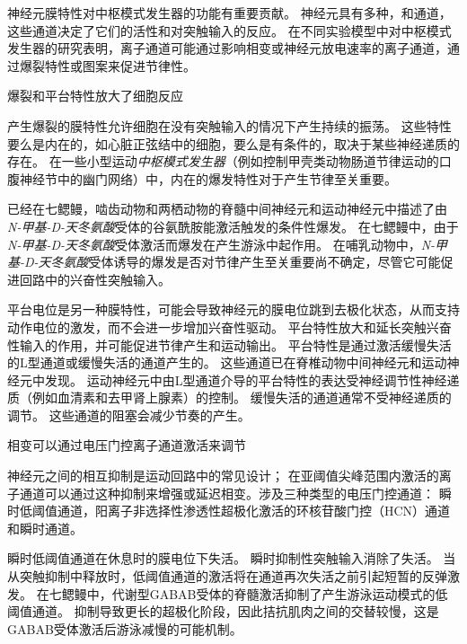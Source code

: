 \begin{proposition}[神经元离子通道有助于中枢模式发生器功能] \label{box:33_2}
	
	\quad \quad 神经元膜特性对中枢模式发生器的功能有重要贡献。
	神经元具有多种，和通道，这些通道决定了它们的活性和对突触输入的反应。
	在不同实验模型中对中枢模式发生器的研究表明，离子通道可能通过影响相变或神经元放电速率的离子通道，通过爆裂特性或图案来促进节律性。
	
	\quad \quad 爆裂和平台特性放大了细胞反应
	
	\quad \quad 产生爆裂的膜特性允许细胞在没有突触输入的情况下产生持续的振荡。
	这些特性要么是内在的，如心脏正弦结中的细胞，要么是有条件的，取决于某些神经递质的存在。
	在一些小型运动\textit{中枢模式发生器}（例如控制甲壳类动物肠道节律运动的口腹神经节中的幽门网络）中，内在的爆发特性对于产生节律至关重要。
	
	\quad \quad 已经在七鳃鳗，啮齿动物和两栖动物的脊髓中间神经元和运动神经元中描述了由\textit{N-甲基-D-天冬氨酸}受体的谷氨酰胺能激活触发的条件性爆发。
	在七鳃鳗中，由于\textit{N-甲基-D-天冬氨酸}受体激活而爆发在产生游泳中起作用。
	在哺乳动物中，\textit{N-甲基-D-天冬氨酸}受体诱导的爆发是否对节律产生至关重要尚不确定，尽管它可能促进回路中的兴奋性突触输入。
	
	\quad \quad 平台电位是另一种膜特性，可能会导致神经元的膜电位跳到去极化状态，从而支持动作电位的激发，而不会进一步增加兴奋性驱动。
	平台特性放大和延长突触兴奋性输入的作用，并可能促进节律产生和运动输出。
	平台特性是通过激活缓慢失活的L型通道或缓慢失活的通道产生的。
	这些通道已在脊椎动物中间神经元和运动神经元中发现。
	运动神经元中由L型通道介导的平台特性的表达受神经调节性神经递质（例如血清素和去甲肾上腺素）的控制。
	缓慢失活的通道通常不受神经递质的调节。
	这些通道的阻塞会减少节奏的产生。
	
	\quad \quad 相变可以通过电压门控离子通道激活来调节
	
	\quad \quad 神经元之间的相互抑制是运动回路中的常见设计；
	在亚阈值尖峰范围内激活的离子通道可以通过这种抑制来增强或延迟相变。涉及三种类型的电压门控通道：
	瞬时低阈值通道，阳离子非选择性渗透性超极化激活的环核苷酸门控（HCN）通道和瞬时通道。
	
	\quad \quad 瞬时低阈值通道在休息时的膜电位下失活。
	瞬时抑制性突触输入消除了失活。
	当从突触抑制中释放时，低阈值通道的激活将在通道再次失活之前引起短暂的反弹激发。
	在七鳃鳗中，代谢型GABAB受体的脊髓激活抑制了产生游泳运动模式的低阈值通道。
	抑制导致更长的超极化阶段，因此拮抗肌肉之间的交替较慢，这是GABAB受体激活后游泳减慢的可能机制。
	

\end{proposition}
